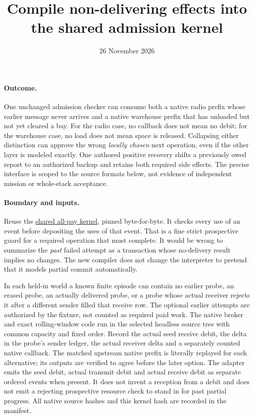 \documentclass{article}
\title{Compile non-delivering effects into the shared admission kernel}
\date{26 November 2026}
\begin{document}
\maketitle
\paragraph{Outcome.}
One unchanged admission checker can consume both a native radio
prefix whose earlier message never arrives and a native warehouse
prefix that has unloaded but not yet cleared a bay. For the radio
case, no callback does not mean no debit; for the warehouse case,
no load does not mean space is released. Collapsing either
distinction can approve the wrong \emph{locally chosen} next
operation, even if the other layer is modeled exactly. One
authored positive recovery shifts a previously owed report to
an authorized backup and retains both required side effects.
The precise interface is scoped to the source formats below, not
evidence of independent mission or whole-stack acceptance.

\paragraph{Boundary and inputs.}
Reuse the \href{https://github.com/eternal-november/eos-research-programmes/pull/595}{shared
all-pay kernel}, pinned byte-for-byte. It checks every use of
an event before depositing the uses of that event. That is a
fine strict prospective guard for a required operation that must
complete. It would be wrong to summarize the \emph{past} failed
attempt as a transaction whose no-delivery result implies no
changes. The new compiler does not change the interpreter to
pretend that it models partial commit automatically.

In each held-in world a known finite episode can contain no earlier
probe, an erased probe, an actually delivered probe, or a probe
whose actual receiver rejects it after a different sender filled
that receive row. The optional earlier attempts are authorized
by the fixture, not counted as required paid work. The native
broker and exact rolling-window code run in the selected
headless source tree with common capacity and fixed order.
Record the actual seed receive debit, the delta in the probe's
sender ledger, the actual receiver delta and a separately
counted native callback. The matched upstream native prefix
is literally replayed for each alternative; its outputs
are verified to agree before the later option.
The adapter emits the seed debit, actual transmit debit and
actual receive debit as separate ordered events when present.
It does not invent a reception from a debit and does not emit
a rejecting prospective resource check to stand in for past
partial progress. All native source hashes and this kernel
hash are recorded in the manifest.
\end{document}
